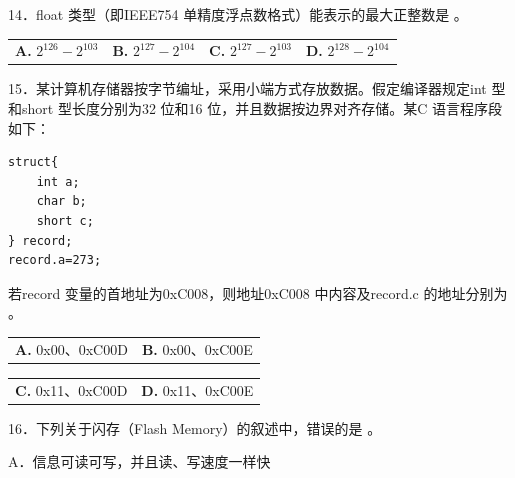 \documentclass[UTF8,11pt]{ctexart}
\begin{document}
14．float 类型（即IEEE754 单精度浮点数格式）能表示的最大正整数是 。


\begin{center}\begin{tabular}{>{\raggedright\arraybackslash}p{\dimexpr(\linewidth-8\tabcolsep)/4\relax}>{\raggedright\arraybackslash}p{\dimexpr(\linewidth-8\tabcolsep)/4\relax}>{\raggedright\arraybackslash}p{\dimexpr(\linewidth-8\tabcolsep)/4\relax}>{\raggedright\arraybackslash}p{\dimexpr(\linewidth-8\tabcolsep)/4\relax}}
\textbf{A.} \(\displaystyle 2^{126}-2^{103}\) & \textbf{B.} \(\displaystyle 2^{127}-2^{104}\) & \textbf{C.} \(\displaystyle 2^{127}-2^{103}\) & \textbf{D.} \(\displaystyle 2^{128}-2^{104}\)\\[.35em]\end{tabular}\end{center}

15．某计算机存储器按字节编址，采用小端方式存放数据。假定编译器规定int 型和short 型长度分别为32 位和16 位，并且数据按边界对齐存储。某C 语言程序段如下：


\begin{Verbatim}[breaklines,breakanywhere,fontsize=\small]
struct{
    int a;
    char b;
    short c;
} record;
record.a=273;
\end{Verbatim}

若record 变量的首地址为0xC008，则地址0xC008 中内容及record.c 的地址分别为 。


\begin{center}\begin{tabular}{>{\raggedright\arraybackslash}p{\dimexpr(\linewidth-4\tabcolsep)/2\relax}>{\raggedright\arraybackslash}p{\dimexpr(\linewidth-4\tabcolsep)/2\relax}}
\textbf{A.} 0x00、0xC00D & \textbf{B.} 0x00、0xC00E\\[.35em]\end{tabular}\end{center}

\begin{center}\begin{tabular}{>{\raggedright\arraybackslash}p{\dimexpr(\linewidth-4\tabcolsep)/2\relax}>{\raggedright\arraybackslash}p{\dimexpr(\linewidth-4\tabcolsep)/2\relax}}
\textbf{C.} 0x11、0xC00D & \textbf{D.} 0x11、0xC00E\\[.35em]\end{tabular}\end{center}

16．下列关于闪存（Flash Memory）的叙述中，错误的是 。


A．信息可读可写，并且读、写速度一样快
\end{document}
